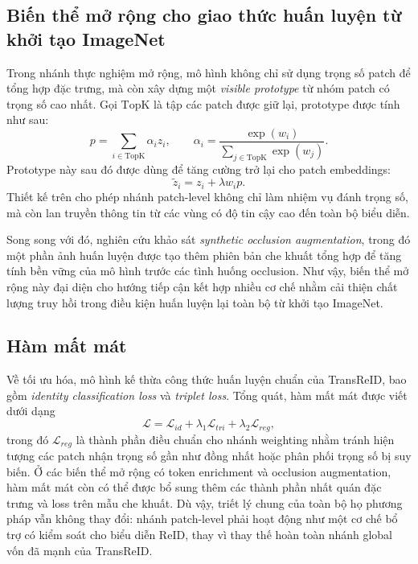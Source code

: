 \subsection{Biến thể mở rộng cho giao thức huấn luyện từ khởi tạo ImageNet}

Trong nhánh thực nghiệm mở rộng, mô hình không chỉ sử dụng trọng số patch để tổng hợp đặc trưng, mà còn xây dựng một \textit{visible prototype} từ nhóm patch có trọng số cao nhất. Gọi \(\mathrm{TopK}\) là tập các patch được giữ lại, prototype được tính như sau:
\[
p = \sum_{i \in \mathrm{TopK}} \alpha_i z_i,
\qquad
\alpha_i = \frac{\exp(w_i)}{\sum_{j \in \mathrm{TopK}} \exp(w_j)}.
\]
Prototype này sau đó được dùng để tăng cường trở lại cho patch embeddings:
\[
\tilde{z}_i = z_i + \lambda w_i p.
\]
Thiết kế trên cho phép nhánh patch-level không chỉ làm nhiệm vụ đánh trọng số, mà còn lan truyền thông tin từ các vùng có độ tin cậy cao đến toàn bộ biểu diễn.

Song song với đó, nghiên cứu khảo sát \textit{synthetic occlusion augmentation}, trong đó một phần ảnh huấn luyện được tạo thêm phiên bản che khuất tổng hợp để tăng tính bền vững của mô hình trước các tình huống occlusion. Như vậy, biến thể mở rộng này đại diện cho hướng tiếp cận kết hợp nhiều cơ chế nhằm cải thiện chất lượng truy hồi trong điều kiện huấn luyện lại toàn bộ từ khởi tạo ImageNet.

\subsection{Hàm mất mát}

Về tối ưu hóa, mô hình kế thừa công thức huấn luyện chuẩn của TransReID, bao gồm \textit{identity classification loss} và \textit{triplet loss}. Tổng quát, hàm mất mát được viết dưới dạng
\[
\mathcal{L}
= \mathcal{L}_{id}
+ \lambda_{1}\mathcal{L}_{tri}
+ \lambda_{2}\mathcal{L}_{reg},
\]
trong đó \(\mathcal{L}_{reg}\) là thành phần điều chuẩn cho nhánh weighting nhằm tránh hiện tượng các patch nhận trọng số gần như đồng nhất hoặc phân phối trọng số bị suy biến. Ở các biến thể mở rộng có token enrichment và occlusion augmentation, hàm mất mát còn có thể được bổ sung thêm các thành phần nhất quán đặc trưng và loss trên mẫu che khuất. Dù vậy, triết lý chung của toàn bộ họ phương pháp vẫn không thay đổi: nhánh patch-level phải hoạt động như một cơ chế bổ trợ có kiểm soát cho biểu diễn ReID, thay vì thay thế hoàn toàn nhánh global vốn đã mạnh của TransReID.
